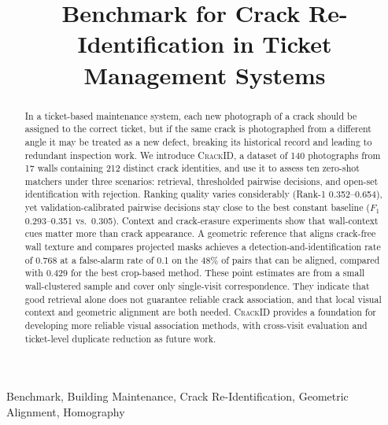 \documentclass[conference,a4paper]{IEEEtran}
\begin{document}
\title{Benchmark for Crack Re-Identification in Ticket Management Systems}
\author{
}
\maketitle
\begin{abstract}
In a ticket-based maintenance system, each new photograph of a crack should be assigned to the correct ticket, but if the same crack is photographed from a different angle it may be treated as a new defect, breaking its historical record and leading to redundant inspection work.
We introduce \textsc{CrackID}, a dataset of 140 photographs from 17 walls containing 212 distinct crack identities, and use it to assess ten zero-shot matchers under three scenarios: retrieval, thresholded pairwise decisions, and open-set identification with rejection.
Ranking quality varies considerably (Rank-1 0.352--0.654), yet validation-calibrated pairwise decisions stay close to the best constant baseline ($F_1$ 0.293--0.351 vs.~0.305).
Context and crack-erasure experiments show that wall-context cues matter more than crack appearance.
A geometric reference that aligns crack-free wall texture and compares projected masks achieves a detection-and-identification rate of 0.768 at a false-alarm rate of 0.1 on the 48\% of pairs that can be aligned, compared with 0.429 for the best crop-based method.
These point estimates are from a small wall-clustered sample and cover only single-visit correspondence.
They indicate that good retrieval alone does not guarantee reliable crack association, and that local visual context and geometric alignment are both needed.
\textsc{CrackID} provides a foundation for developing more reliable visual association methods, with cross-visit evaluation and ticket-level duplicate reduction as future work.
\end{abstract}
\begin{IEEEkeywords}
Benchmark, Building Maintenance, Crack Re-Identification,
Geometric Alignment, Homography
\end{IEEEkeywords}









\end{document}
